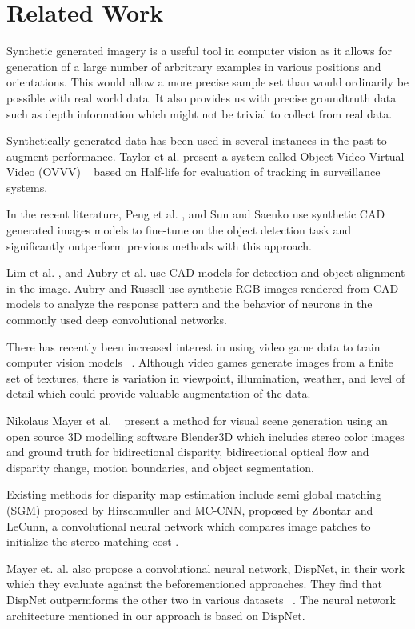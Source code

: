 \section{Related Work}
Synthetic generated imagery is a useful tool in computer vision as it allows for generation of a large number of arbritrary examples in various positions and orientations. This would allow a more precise sample set than would ordinarily be possible with real world data. It also provides us with precise groundtruth data such as depth information which might not be trivial to collect from real data.

Synthetically generated data has been used in several instances in the past to augment performance. Taylor et al. present a system called Object Video Virtual Video (OVVV) ~\cite{Taylor_2007} based on Half-life for evaluation of tracking in surveillance systems. 
 
In the recent literature, Peng et al. , and Sun and Saenko use synthetic CAD generated images models to fine-tune on the object detection task and significantly outperform previous methods with this approach. 

Lim et al. , and Aubry et al. use CAD models for detection and object alignment in the image. Aubry and Russell use synthetic RGB images rendered from CAD models to analyze the response pattern and the behavior of neurons in the commonly used deep convolutional networks.

There has recently been increased interest in using video game data to train computer vision models ~\cite{Shafaei_LS16}. Although video games generate images from a finite set of textures, there is variation in viewpoint, illumination, weather, and level of detail which could provide valuable augmentation of the data. 

Nikolaus Mayer et al. ~\cite{MayerIHFCDB15} present a method for visual scene generation using an open source 3D modelling software Blender3D which includes stereo color images and ground truth for bidirectional disparity, bidirectional optical flow and disparity change, motion boundaries, and object segmentation.

Existing methods for disparity map estimation include semi global matching (SGM) proposed by Hirschmuller \cite{Hirschmuller} and MC-CNN, proposed by Zbontar and LeCunn, a convolutional neural network which compares image patches to initialize the stereo matching cost \cite{ZbontarL15}.

Mayer et. al. also propose a convolutional neural network, DispNet, in their work which they evaluate against the beforementioned approaches. They find that DispNet outpermforms the other two in various datasets ~\cite{MayerIHFCDB15}. The neural network architecture mentioned in our approach is based on DispNet.